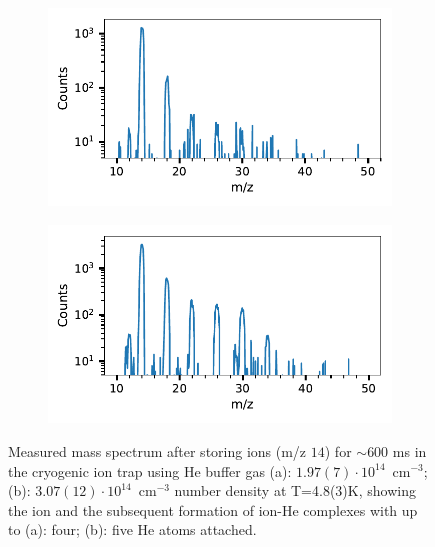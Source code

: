 \begin{figure}[!htb]

    \centering

    \begin{subfigure}[b]{0.49\textwidth}
        \centering
        \includegraphics[width=1\textwidth]{figures/measurements/masspec/CD+_masspec_lowP_1.6e+14_4.8K.pdf}
        \caption{}
        \label{fig:masspec:lownHe}
    \end{subfigure}
    \hfill
    \begin{subfigure}[b]{0.49\textwidth}
        \centering
        \includegraphics[width=1\textwidth]{figures/measurements/masspec/CD+_masspec_highP_2.5e+14_4.8K.pdf}
        \caption{}
        \label{fig:masspec:highnHe}
    \end{subfigure}
    
    \caption{ Measured mass spectrum after storing \CD ions (m/z $14$) for $\sim$600 ms in the cryogenic ion trap using He buffer gas (a): $1.97(7)\cdot10^{14}$~cm$^{-3}$; (b): $3.07(12)\cdot10^{14}$~cm$^{-3}$ number density at T=4.8(3)K, showing the \CD ion and the subsequent formation of ion-He complexes with up to (a): four; (b): five He atoms attached.}
    \label{fig:masspec}

\end{figure}
